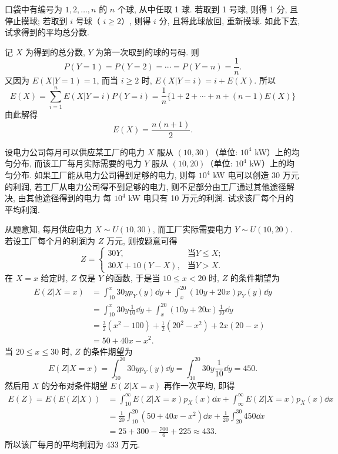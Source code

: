 	\begin{example}\label{exam:3.5.8}
		口袋中有编号为 $1,2,\ldots,n$ 的 $n$ 个球, 从中任取 1 球. 若取到 1 号球, 则得 1 分, 
		且停止摸球; 若取到 $i$ 号球（ $i\geq 2$）, 则得 $i$ 分, 且将此球放回, 重新摸球.
		如此下去, 试求得到的平均总分数.
	\end{example}
	\begin{solution}
		记 $X$ 为得到的总分数, $Y$ 为第一次取到的球的号码. 则
		\[
			P(Y=1)=P(Y=2)=\cdots=P(Y=n)=\frac{1}{n}.
			\]
		又因为 $E(X | Y=1)=1$, 而当 $i\geq 2$ 时, $E(X | Y=i)=i+E(X)$. 所以
		\[
			E(X)=\sum_{i=1}^{n} E(X | Y=i) P(Y=i)=\frac{1}{n}\{1+2+\cdots+n+(n-1) E(X)\}
			\]
			由此解得
			\[
				E(X)=\frac{n(n+1)}{2}.
				\]
	\end{solution}
	\begin{example}
		设电力公司每月可以供应某工厂的电力 $X$ 服从 $(10,30)$（单位: $10^4$ kW）上的均匀分布, 
		而该工厂每月实际需要的电力 $Y$ 服从 $(10,20)$（单位: $10^4$ kW）上的均匀分布. 
		如果工厂能从电力公司得到足够的电力, 则每 $10^4$ kW 电可以创造 30 万元的利润, 
		若工厂从电力公司得不到足够的电力, 则不足部分由工厂通过其他途径解决, 由其他途径得到的电力
		每 $10^4$ kW 电只有 10 万元的利润. 试求该厂每个月的平均利润. 
	\end{example}
	\begin{solution}
		从题意知, 每月供应电力 $X\sim U(10,30)$, 而工厂实际需要电力 $Y\sim U(10,20)$. 
		若设工厂每个月的利润为 $Z$ 万元, 则按题意可得
		\[
		Z=\begin{cases}30 Y, & \text{当} Y\leq X;\\
			30 X+10(Y-X), &  \text{当} Y > X.
			\end{cases}
			\]
		在 $X=x$ 给定时, $Z$ 仅是 $Y$ 的函数, 于是当 $10\leq x<20$ 时, $Z$ 的条件期望为
		\begin{align*}
			E(Z | X=x)&=\int_{10}^{x} 30 y p_{Y}(y) \dd y+\int_{x}^{20}(10 y+20 x) p_{Y}(y) \dd y	\\
				&=\int_{10}^{x} 30 y \frac{1}{10} \dd y+\int_{x}^{20}(10 y+20 x) \frac{1}{10} \dd y	\\
				&=\frac{3}{2}\left(x^{2}-100\right)+\frac{1}{2}\left(20^{2}-x^{2}\right)+2 x(20-x)	\\
				&=50+40 x-x^{2}.
		\end{align*}
		当 $20\leq x\leq 30$ 时, $Z$ 的条件期望为
		\[
			E(Z | X=x)=\int_{10}^{20} 30 y p_{Y}(y) \dd y=\int_{10}^{20} 30 y \frac{1}{10} \dd y=450.
			\]
		然后用 $X$ 的分布对条件期望 $E(Z|X=x)$ 再作一次平均, 即得
		\begin{align*} 
		E(Z)=E(E(Z | X)) &=\int_{10}^{\infty} E(Z | X=x) p_{X}(x) \dd x+\int_{\infty}^{\infty} E(Z | X=x) p_{X}(x) \dd x \\
		&=\frac{1}{20} \int_{10}^{20}\left(50+40 x-x^{2}\right) \dd x+\frac{1}{20} \int_{20}^{30} 450 \dd x \\
		&=25+300-\frac{700}{6}+225 \approx 433. \end{align*}
		所以该厂每月的平均利润为 433 万元.
	\end{solution}
